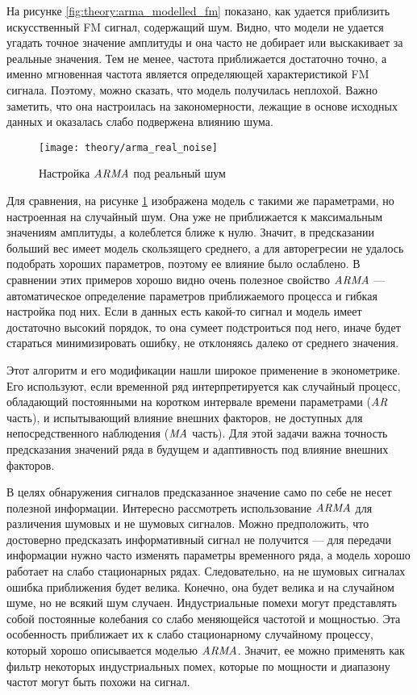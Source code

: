 На рисунке \ref{fig:theory:arma_modelled_fm} показано, как удается приблизить искусственный FM сигнал, содержащий шум. Видно, что модели не удается угадать точное значение амплитуды и она часто не добирает или выскакивает за реальные значения. Тем не менее, частота приближается достаточно точно, а именно мгновенная частота является определяющей характеристикой FM сигнала. Поэтому, можно сказать, что модель получилась неплохой. Важно заметить, что она настроилась на закономерности, лежащие в основе исходных данных и оказалась слабо подвержена влиянию шума.

\begin{figure}[h]
  \centering
  \texttt{[image: theory/arma\_real\_noise]}
  \caption{Настройка $\mathit{ARMA}$ под реальный шум}
  \label{fig:theory:arma_real_noise}
\end{figure}

Для сравнения, на рисунке \ref{fig:theory:arma_real_noise} изображена модель с такими же параметрами, но настроенная на случайный шум. Она уже не приближается к максимальным значениям амплитуды, а колеблется ближе к нулю. Значит, в предсказании больший вес имеет модель скользящего среднего, а для авторегресии не удалось подобрать хороших параметров, поэтому ее влияние было ослаблено. В сравнении этих примеров хорошо видно очень полезное свойство $\mathit{ARMA}$ --- автоматическое определение параметров приближаемого процесса и гибкая настройка под них. Если в данных есть какой-то сигнал и модель имеет достаточно высокий порядок, то она сумеет подстроиться под него, иначе будет стараться минимизировать ошибку, не отклоняясь далеко от среднего значения.

Этот алгоритм и его модификации нашли широкое применение в эконометрике. Его используют, если временной ряд интерпретируется как случайный процесс, обладающий постоянными на коротком интервале времени параметрами ($\mathit{AR}$ часть), и испытывающий влияние внешних факторов, не доступных для непосредственного наблюдения ($\mathit{MA}$ часть). Для этой задачи важна точность предсказания значений ряда в будущем и адаптивность под влияние внешних факторов.

В целях обнаружения сигналов предсказанное значение само по себе не несет полезной информации. Интересно рассмотреть использование $\mathit{ARMA}$ для различения шумовых и не шумовых сигналов. Можно предположить, что достоверно предсказать информативный сигнал не получится --- для передачи информации нужно часто изменять параметры временного ряда, а модель хорошо работает на слабо стационарных рядах. Следовательно, на не шумовых сигналах ошибка приближения будет велика. Конечно, она будет велика и на случайном шуме, но не всякий шум случаен. Индустриальные помехи могут представлять собой постоянные колебания со слабо меняющейся частотой и мощностью. Эта особенность приближает их к слабо стационарному случайному процессу, который хорошо описывается моделью $\mathit{ARMA}$. Значит, ее можно применять как фильтр некоторых индустриальных помех, которые по мощности и диапазону частот могут быть похожи на сигнал.

